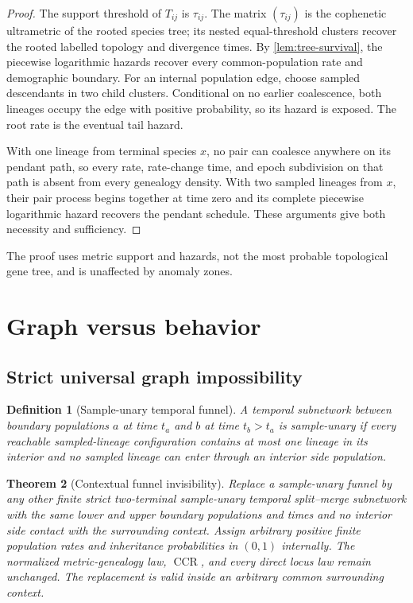 \documentclass[11pt]{article}
\newtheorem{theorem}{Theorem}[section]
\newtheorem{definition}[theorem]{Definition}
\newcommand{\CCR}{\operatorname{CCR}}
\begin{document}
\begin{proof}
The support threshold of $T_{ij}$ is $\tau_{ij}$.  The matrix $(\tau_{ij})$ is the cophenetic ultrametric of the rooted species tree; its nested equal-threshold clusters recover the rooted labelled topology and divergence times.  By \cref{lem:tree-survival}, the piecewise logarithmic hazards recover every common-population rate and demographic boundary.  For an internal population edge, choose sampled descendants in two child clusters.  Conditional on no earlier coalescence, both lineages occupy the edge with positive probability, so its hazard is exposed.  The root rate is the eventual tail hazard.

With one lineage from terminal species $x$, no pair can coalesce anywhere on its pendant path, so every rate, rate-change time, and epoch subdivision on that path is absent from every genealogy density.  With two sampled lineages from $x$, their pair process begins together at time zero and its complete piecewise logarithmic hazard recovers the pendant schedule.  These arguments give both necessity and sufficiency.
\end{proof}

The proof uses metric support and hazards, not the most probable topological gene tree, and is unaffected by anomaly zones.

\section{Graph versus behavior}
\label{sec:graph}

\subsection{Strict universal graph impossibility}

\begin{definition}[Sample-unary temporal funnel]
A temporal subnetwork between boundary populations $a$ at time $t_a$ and $b$ at time $t_b>t_a$ is sample-unary if every reachable sampled-lineage configuration contains at most one lineage in its interior and no sampled lineage can enter through an interior side population.
\end{definition}

\begin{theorem}[Contextual funnel invisibility]
\label{thm:funnel}
Replace a sample-unary funnel by any other finite strict two-terminal sample-unary temporal split--merge subnetwork with the same lower and upper boundary populations and times and no interior side contact with the surrounding context.  Assign arbitrary positive finite population rates and inheritance probabilities in $(0,1)$ internally.  The normalized metric-genealogy law, $\CCR$, and every direct locus law remain unchanged.  The replacement is valid inside an arbitrary common surrounding context.
\end{theorem}
\end{document}
